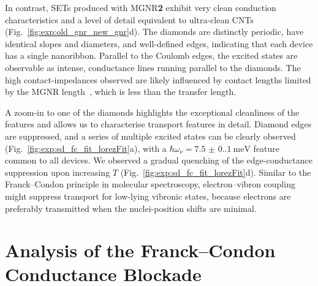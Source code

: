 In contrast, \glspl{SET} produced with \gls{MGNR}\textbf{2} exhibit very clean conduction characteristics and a level of detail equivalent to ultra-clean CNTs (Fig.~\ref{fig:exp:old_gnr_new_gnr}d). The diamonds are distinctly periodic, have identical slopes and diameters, and well-defined edges, indicating that each device has a single nanoribbon. Parallel to the Coulomb edges, the excited states are observable as intense, conductance lines running parallel to the diamonds. The high contact-impedances observed are likely influenced by contact lengths limited by the MGNR length~\cite{grosse2011nanoscale}, which is less than the transfer length.

A zoom-in to one of the diamonds highlights the exceptional cleanliness of the features and allows us to characterise transport features in detail. Diamond edges are suppressed, and a series of multiple excited states can be clearly observed (Fig.~\ref{fig:exp:sd_fc_fit_lorezFit}a), with a $\hbar\omega_\nu=\SI[separate-uncertainty = true]{7.5(0.1)}{\milli\electronvolt}$ feature common to all devices. We observed a gradual quenching of the edge-conductance suppression upon increasing $T$ (Fig.~\ref{fig:exp:sd_fc_fit_lorezFit}d). Similar to the Franck--Condon principle in molecular spectroscopy, electron--vibron coupling might suppress transport for low-lying vibronic states, because electrons are preferably transmitted when the nuclei-position shifts are minimal.

\section{Analysis of the Franck--Condon Conductance Blockade}\label{solubility:sec:fc}

